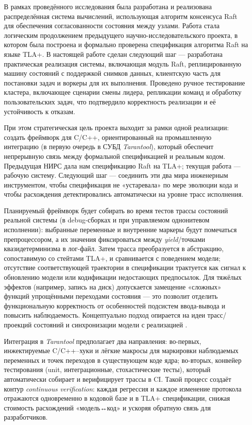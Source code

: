 \conclusion

В рамках проведённого исследования была разработана и реализована
распределённая система вычислений, использующая алгоритм консенсуса Raft для
обеспечения согласованности состояния между узлами. Работа стала логическим
продолжением предыдущего научно-исследовательского проекта, в котором была
построена и формально проверена спецификация алгоритма Raft на языке TLA+. В
настоящей работе сделан следующий шаг — разработана практическая реализация
системы, включающая модуль Raft, реплицированную машину состояний с поддержкой
снимков данных, клиентскую часть для постановки задач и воркеры для их выполнения.
Проведено ручное тестирование кластера, включающее сценарии смены лидера,
репликации команд и обработку пользовательских задач, что подтвердило
корректность реализации и её устойчивость к отказам.

При этом стратегическая цель проекта выходит за рамки одной реализации: создать
фреймворк для C/C++, ориентированный на промышленную интеграцию (в первую
очередь в СУБД \textit{Tarantool}), который обеспечит непрерывную связь между
формальной спецификацией и реальным кодом. Предыдущая НИРС дала нам
спецификацию Raft на TLA+; текущая работа — рабочую систему. Следующий шаг —
соединить эти два мира инженерным инструментом, чтобы спецификация не
«устаревала» по мере эволюции кода и чтобы расхождения детектировались
автоматически на уровне трасс исполнения.

Планируемый фреймворк будет собирать во время тестов трассы состояний реальной
системы (в debug-сборках и при управляемом однонитевом исполнении): выбранные
переменные и внутренние маркеры будут помечаться препроцессором, а их значения
фиксироваться между \emph{yield}/точками квазидетерминизма в лог-файл. Затем
трасса преобразуется в абстракцию, сопоставимую со стейтами TLA+, и
сравнивается с поведением модели; отсутствие соответствующей траектории в
спецификации трактуется как сигнал к обновлению модели или кодификации
недостающих предпосылок. Для тяжёлых эффектов (например, запись на диск)
допускается замещение «сложных» функций упрощёнными переходами состояния — это
позволит отделить функциональную корректность от особенностей подсистем
ввода-вывода и повысить наблюдаемость. Концептуально подход опирается на идеи
трасс/проекций состояний и синхронизации модели с реализацией
\cite{trace_pn,tlacoverage,merz2024}.

Интеграция в \textit{Tarantool} предполагает два направления: во-первых,
инжектируемые C/C++–хуки и лёгкие макросы для маркировки наблюдаемых переменных
и точек переходов в существующем коде ядра; во-вторых, конвейер тестирования
(unit, интеграционные, стохастические тесты), который автоматически собирает и
верифицирует трассы в CI. Такой процесс создаёт контур \emph{continuous
verification}: каждая регрессия и каждое изменение протокола отражаются
одновременно в кодовой базе и в TLA+ спецификации, снижая стоимость расхождений
«модель↔код» и ускоряя обратную связь для разработчиков.


